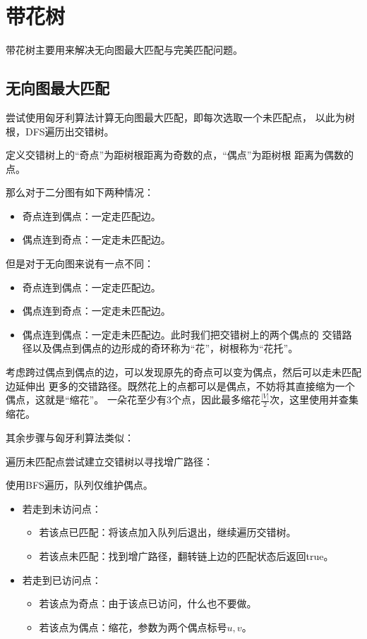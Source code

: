 \section{带花树}
带花树主要用来解决无向图最大匹配与完美匹配问题。
\subsection{无向图最大匹配}
尝试使用匈牙利算法计算无向图最大匹配，即每次选取一个未匹配点，
以此为树根，DFS遍历出交错树。

定义交错树上的``奇点''为距树根距离为奇数的点，``偶点''为距树根
距离为偶数的点。

那么对于二分图有如下两种情况：
\begin{itemize}
    \item 奇点连到偶点：一定走匹配边。
    \item 偶点连到奇点：一定走未匹配边。
\end{itemize}

但是对于无向图来说有一点不同：
\begin{itemize}
    \item 奇点连到偶点：一定走匹配边。
    \item 偶点连到奇点：一定走未匹配边。
    \item 偶点连到偶点：一定走未匹配边。此时我们把交错树上的两个偶点的
    交错路径以及偶点到偶点的边形成的奇环称为``花''，树根称为``花托''。
\end{itemize}

考虑跨过偶点到偶点的边，可以发现原先的奇点可以变为偶点，然后可以走未匹配边延伸出
更多的交错路径。既然花上的点都可以是偶点，不妨将其直接缩为一个偶点，这就是``缩花''。
一朵花至少有3个点，因此最多缩花$\frac{|V|}{2}$次，这里使用并查集缩花。

其余步骤与匈牙利算法类似：

遍历未匹配点尝试建立交错树以寻找增广路径：

使用BFS遍历，队列仅维护偶点。
\begin{itemize}
    \item 若走到未访问点：
    \begin{itemize}
        \item 若该点已匹配：将该点加入队列后退出，继续遍历交错树。
        \item 若该点未匹配：找到增广路径，翻转链上边的匹配状态后返回true。
    \end{itemize}
    \item 若走到已访问点：
    \begin{itemize}
        \item 若该点为奇点：由于该点已访问，什么也不要做。
        \item 若该点为偶点：缩花，参数为两个偶点标号$u,v$。
    \end{itemize}
\end{itemize}

